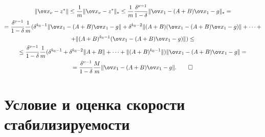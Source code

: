 \begin{gather*}


\|{\ov x_{\nu}}-z^*\|\le \frac{1}{m}


\|{\ov x_{\nu}}-z^*\|_*\le \frac{1}{m}


\frac{{\delta}^{{\nu}-1}}{1-{\delta}}\|{\ov x_1}-(A+B){\ov x_1}-g\|_*= \\


%


=\frac{{\delta}^{{\nu}-1}}{1-{\delta}}\frac{1}{m}


({\delta}^{k_0-1}\|{\ov x_1}-(A+B){\ov x_1}-g\|+


{\delta}^{k_0-2}\|(A+B)({\ov x_1}-(A+B){\ov x_1}-g)\|+\dotsb+\\


%


+\|(A+B)^{k_0-1}({\ov x_1}-(A+B){\ov x_1}-g)\|)\le \\


%


\le \frac{{\delta}^{{\nu}-1}}{1-{\delta}}\frac{1}{m}


({\delta}^{k_0-1}+{\delta}^{k_0-2}


\|A+B\|+\dotsb+\|(A+B)^{k_0-1}


\|)\|{\ov x_1}-(A+B){\ov x_1}-g\|=\\


%


=\frac{{\delta}^{{\nu}-1}}{1-{\delta}}


\frac{M}{m}\|{\ov x_1}-(A+B){\ov x_1}-g\|.\qquad\square


\end{gather*}





\section{Условие и оценка скорости стабилизируемости}





